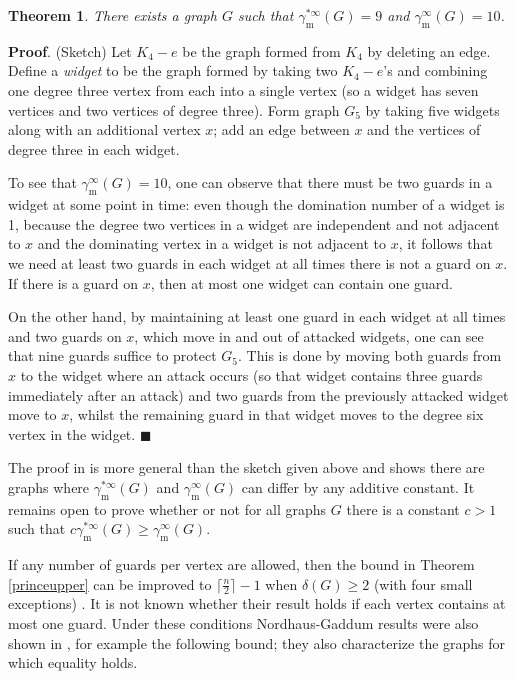 \documentclass[12pt]{article}%
\newtheorem{theorem}{Theorem}[section]
\begin{document}
\begin{theorem}
There exists a graph $G$ such that $\gamma_{\mathrm{m}}^{*\infty}(G)=9$ and
$\gamma_{\mathrm{m}}^{\infty}(G)=10$.
\end{theorem}

\noindent\textbf{Proof}.\hspace{0.1in} (Sketch) Let $K_{4}-e$ be the graph
formed from $K_{4}$ by deleting an edge. Define a \textit{widget} to be the
graph formed by taking two $K_{4}-e$'s and combining one degree three vertex
from each into a single vertex (so a widget has seven vertices and two
vertices of degree three). Form graph $G_{5}$ by taking five widgets along
with an additional vertex $x$; add an edge between $x$ and the vertices of
degree three in each widget.

To see that $\gamma_{\mathrm{m}}^{\infty}(G)=10$, one can observe that there
must be two guards in a widget at some point in time: even though the
domination number of a widget is 1, because the degree two vertices in a
widget are independent and not adjacent to $x$ and the dominating vertex in a
widget is not adjacent to $x$, it follows that we need at least two guards in
each widget at all times there is not a guard on $x$. If there is a guard on
$x$, then at most one widget can contain one guard.

On the other hand, by maintaining at least one guard in each widget at all
times and two guards on $x$, which move in and out of attacked widgets, one
can see that nine guards suffice to protect $G_{5}$. This is done by moving
both guards from $x$ to the widget where an attack occurs (so that widget
contains three guards immediately after an attack) and two guards from the
previously attacked widget move to $x$, whilst the remaining guard in that
widget moves to the degree six vertex in the widget. \hfill$\blacksquare$

\medskip

The proof in \cite{FG} is more general than the sketch given above and shows
there are graphs where $\gamma_{\mathrm{m}}^{*\infty}(G)$ and $\gamma
_{\mathrm{m}}^{\infty}(G)$ can differ by any additive constant. It remains
open to prove whether or not for all graphs $G$ there is a constant $c > 1$
such that $c\gamma_{\mathrm{m}}^{*\infty}(G) \geq\gamma_{\mathrm{m}}^{\infty
}(G)$.

If any number of guards per vertex are allowed, then the bound in Theorem
\ref{princeupper} can be improved to $\lceil\frac{n}{2}\rceil-1$ when
$\delta(G)\geq2$ (with four small exceptions) \cite{prince2}. It is not known
whether their result holds if each vertex contains at most one guard. Under
these conditions Nordhaus-Gaddum results were also shown in \cite{prince2},
for example the following bound; they also characterize the graphs for which
equality holds.
\end{document}
